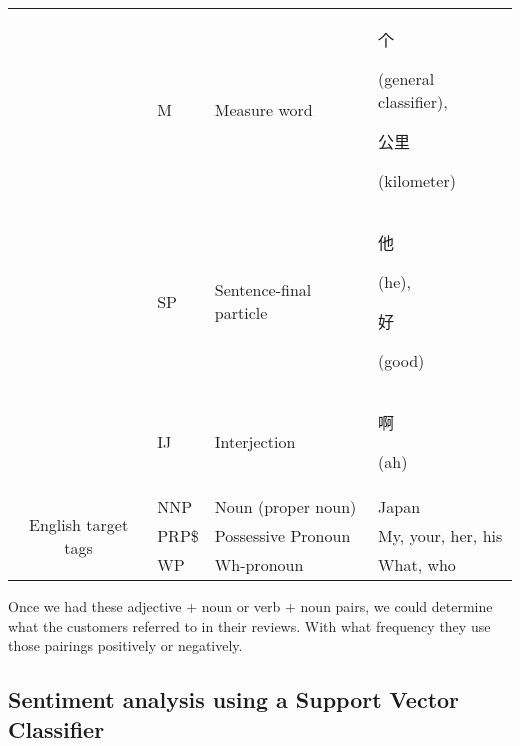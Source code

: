 \documentclass[smallextended,natbib]{svjour3}       %
\begin{document}
\begin{table}[ht]
{\begin{tabular}{|c|l|l|l|}
         &
          M &
          Measure word &
          \begin{CJK}{UTF8}{gbsn}个\end{CJK} (general classifier), \begin{CJK}{UTF8}{gbsn}公里\end{CJK} (kilometer) \\ \cline{2-4} 
         &
          SP &
          Sentence-final particle &
          \begin{CJK}{UTF8}{gbsn}他\end{CJK} (he), \begin{CJK}{UTF8}{gbsn}好\end{CJK} (good) \\ \cline{2-4} 
                                                & IJ    & Interjection       & \begin{CJK}{UTF8}{gbsn}啊\end{CJK} (ah)     \\ \hline
        \multirow{3}{*}{English target tags}    & NNP   & Noun (proper noun) & Japan                                      \\ \cline{2-4} 
                                                & PRP\$ & Possessive Pronoun & My, your, her, his                         \\ \cline{2-4} 
                                                & WP    & Wh-pronoun         & What, who                                  \\ \hline
        \end{tabular}%
        }
    \end{table}

    Once we had these adjective + noun or verb + noun pairs, we could determine what the customers referred to in their reviews. With what frequency they use those pairings positively or negatively.

  \subsection{Sentiment analysis using a Support Vector Classifier}\label{sentimentanalysis}
\end{document}

